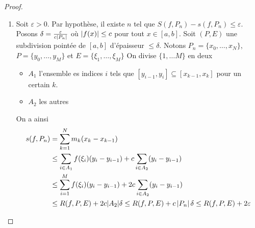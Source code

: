 \begin{proof}
\begin{enumerate}
    \item   Soit $\varepsilon > 0$.
    Par hypothèse, il existe $n$ tel que $S(f,P_n)-s(f,P_n) \le \varepsilon$. Posons $\delta = \frac{\varepsilon}{c\left| P_n \right|}$ où $\left| f(x) \right|\le c$ pour tout $x\in[a,b]$. 
    Soit $(P,E)$ une subdivision pointée de $[a,b]$ d'épaisseur $\le \delta$. Notons $P_n = \{x_0,\ldots,x_N\}$, $P = \{y_0,\ldots,y_M\}$ et $E = \{\xi_1,\ldots,\xi_M\}$
    On divise $\{1,\ldots M\}$ en deux 
    \begin{itemize}
        \item $A_1$ l'ensemble es indices $i$ tels que $[y_{i-1},y_i]\subseteq [x_{k-1},x_k]$ pour un certain $k$.
        \item $A_2$ les autres 
    \end{itemize}
    On a ainsi
    \begin{align*}
        s(f,P_n) &= \sum_{k = 1}^N m_k(x_{k} - x_{k-1})\\
        &\le  \sum_{i \in A_1}f(\xi_i)(y_i - y_{i-1})
        +  c\sum_{i\in A_2} (y_{i} - y_{i-1})\\
        &\le \sum_{i = 1}^Mf(\xi_i)(y_i - y_{i-1}) + 2c\sum_{i\in A_2} (y_{i} - y_{i-1})\\
        &\le R(f,P,E) + 2c |A_2|\delta \le R(f,P,E)+ c\left| P_n \right| \delta\le R(f,P,E)+ 2\varepsilon
    \end{align*}


\end{enumerate}
\end{proof}
